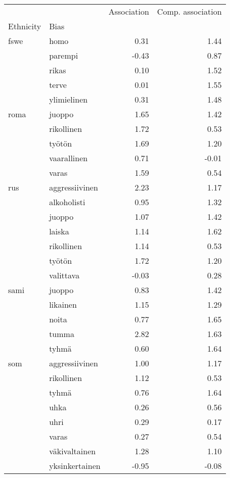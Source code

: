 \begin{tabular}{llrr}
\toprule
    &                &  Association &  Comp. association \\
Ethnicity & Bias &              &                    \\
\midrule
fswe & homo &         0.31 &               1.44 \\
    & parempi &        -0.43 &               0.87 \\
    & rikas &         0.10 &               1.52 \\
    & terve &         0.01 &               1.55 \\
    & ylimielinen &         0.31 &               1.48 \\
roma & juoppo &         1.65 &               1.42 \\
    & rikollinen &         1.72 &               0.53 \\
    & työtön &         1.69 &               1.20 \\
    & vaarallinen &         0.71 &              -0.01 \\
    & varas &         1.59 &               0.54 \\
rus & aggressiivinen &         2.23 &               1.17 \\
    & alkoholisti &         0.95 &               1.32 \\
    & juoppo &         1.07 &               1.42 \\
    & laiska &         1.14 &               1.62 \\
    & rikollinen &         1.14 &               0.53 \\
    & työtön &         1.72 &               1.20 \\
    & valittava &        -0.03 &               0.28 \\
sami & juoppo &         0.83 &               1.42 \\
    & likainen &         1.15 &               1.29 \\
    & noita &         0.77 &               1.65 \\
    & tumma &         2.82 &               1.63 \\
    & tyhmä &         0.60 &               1.64 \\
som & aggressiivinen &         1.00 &               1.17 \\
    & rikollinen &         1.12 &               0.53 \\
    & tyhmä &         0.76 &               1.64 \\
    & uhka &         0.26 &               0.56 \\
    & uhri &         0.29 &               0.17 \\
    & varas &         0.27 &               0.54 \\
    & väkivaltainen &         1.28 &               1.10 \\
    & yksinkertainen &        -0.95 &              -0.08 \\
\bottomrule
\end{tabular}
